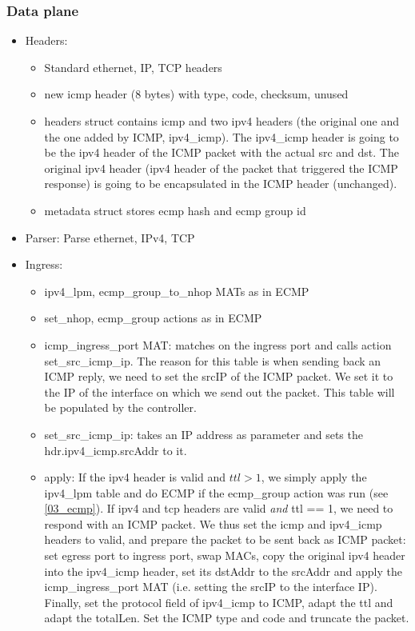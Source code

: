 \documentclass[11pt,oneside,a4paper]{article}
\begin{document}
\subsubsection{Data plane}

\vspace{-\topsep}
\begin{itemize}
	\setlength{\itemsep}{0pt}
	\setlength{\parskip}{0pt}
	\item Headers:
	\begin{itemize}
		\setlength{\itemsep}{0pt}
		\setlength{\parskip}{0pt}
		\item Standard ethernet, IP, TCP headers
		\item new icmp header (8 bytes) with type, code, checksum, unused
		\item headers struct contains icmp and two ipv4 headers (the original one and the one added by ICMP, ipv4\_icmp). The ipv4\_icmp header is going to be the ipv4 header of the ICMP packet with the actual src and dst. The original ipv4 header (ipv4 header of the packet that triggered the ICMP response) is going to be encapsulated in the ICMP header (unchanged). 
		\item metadata struct stores ecmp hash and ecmp group id
	\end{itemize}
	\item Parser: Parse ethernet, IPv4, TCP
	\item Ingress:
	\begin{itemize}
		\setlength{\itemsep}{0pt}
		\setlength{\parskip}{0pt}
		\item ipv4\_lpm, ecmp\_group\_to\_nhop MATs as in ECMP
		\item set\_nhop, ecmp\_group actions as in ECMP
		\item icmp\_ingress\_port MAT: matches on the ingress port and calls action set\_src\_icmp\_ip. The reason for this table is when sending back an ICMP reply, we need to set the srcIP of the ICMP packet. We set it to the IP of the interface on which we send out the packet. This table will be populated by the controller.
		\item set\_src\_icmp\_ip: takes an IP address as parameter and sets the hdr.ipv4\_icmp.srcAddr to it.
		\item apply: If the ipv4 header is valid and $ttl > 1$, we simply apply the ipv4\_lpm table and do ECMP if the ecmp\_group action was run (see \ref{03_ecmp}). If ipv4 and tcp headers are valid \textit{and} ttl == 1, we need to respond with an ICMP packet. We thus set the icmp and ipv4\_icmp headers to valid, and prepare the packet to be sent back as ICMP packet: set egress port to ingress port, swap MACs, copy the original ipv4 header into the ipv4\_icmp header, set its dstAddr to the srcAddr and apply the icmp\_ingress\_port MAT (i.e. setting the srcIP to the interface IP). Finally, set the protocol field of ipv4\_icmp to ICMP, adapt the ttl and adapt the totalLen. Set the ICMP type and code and truncate the packet.

\end{itemize}
\end{itemize}
\end{document}
